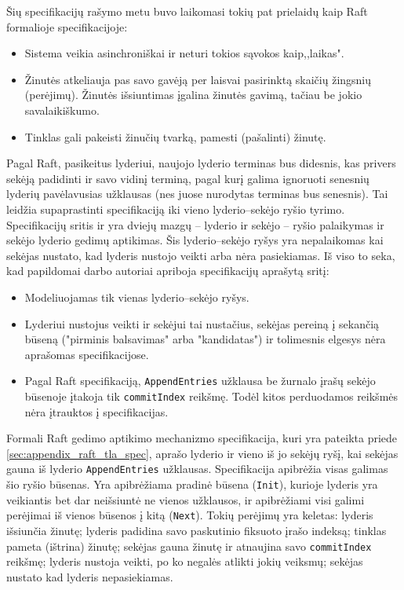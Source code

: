 \documentclass{VUMIFPSkursinis}
\begin{document}
Šių specifikacijų rašymo metu buvo laikomasi tokių pat prielaidų kaip Raft formalioje specifikacijoje:

\begin{itemize}
\item Sistema veikia asinchroniškai ir neturi tokios sąvokos kaip,,laikas".
\item Žinutės atkeliauja pas savo gavėją per laisvai pasirinktą skaičių žingsnių (perėjimų). Žinutės išsiuntimas įgalina žinutės gavimą, tačiau be jokio savalaikiškumo.
\item Tinklas gali pakeisti žinučių tvarką, pamesti (pašalinti) žinutę.
\end{itemize}

Pagal Raft, pasikeitus lyderiui, naujojo lyderio terminas bus didesnis, kas privers sekėją padidinti ir savo vidinį terminą, pagal kurį galima ignoruoti senesnių lyderių pavėlavusias užklausas (nes juose nurodytas terminas bus senesnis). Tai leidžia supaprastinti specifikaciją iki vieno lyderio--sekėjo ryšio tyrimo. Specifikacijų sritis ir yra dviejų mazgų -- lyderio ir sekėjo -- ryšio palaikymas ir sekėjo lyderio gedimų aptikimas. Šis lyderio--sekėjo ryšys yra nepalaikomas kai sekėjas nustato, kad lyderis nustojo veikti arba nėra pasiekiamas. Iš viso to seka, kad papildomai darbo autoriai apriboja specifikacijų aprašytą sritį:

\begin{itemize}
\item Modeliuojamas tik vienas lyderio--sekėjo ryšys.
\item Lyderiui nustojus veikti ir sekėjui tai nustačius, sekėjas pereiną į sekančią būseną ("pirminis balsavimas" arba "kandidatas") ir tolimesnis elgesys nėra aprašomas specifikacijose.
\item Pagal Raft specifikaciją, \texttt{AppendEntries} užklausa be žurnalo įrašų sekėjo būsenoje įtakoja tik \texttt{commitIndex} reikšmę\cite{ongaro_consensus}. Todėl kitos perduodamos reikšmės nėra įtrauktos į specifikacijas. 
\end{itemize}

Formali Raft gedimo aptikimo mechanizmo specifikacija, kuri yra pateikta priede \ref{sec:appendix_raft_tla_spec}, aprašo lyderio ir vieno iš jo sekėjų ryšį, kai sekėjas gauna iš lyderio \texttt{AppendEntries} užklausas. Specifikacija apibrėžia visas galimas šio ryšio būsenas. Yra apibrėžiama pradinė būsena (\texttt{Init}), kurioje lyderis yra veikiantis bet dar neišsiuntė ne vienos užklausos, ir apibrėžiami visi galimi perėjimai iš vienos būsenos į kitą (\texttt{Next}). Tokių perėjimų yra keletas: lyderis išsiunčia žinutę; lyderis padidina savo paskutinio fiksuoto įrašo indeksą; tinklas pameta (ištrina) žinutę; sekėjas gauna žinutę ir atnaujina savo \texttt{commitIndex} reikšmę; lyderis nustoja veikti, po ko negalės atlikti jokių veiksmų; sekėjas nustato kad lyderis nepasiekiamas. 
\end{document}
